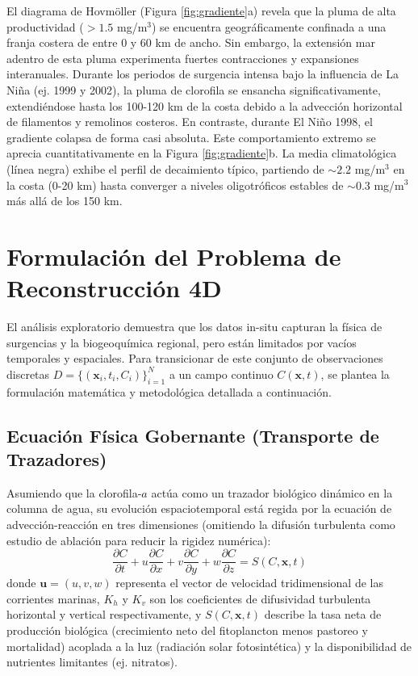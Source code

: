 \documentclass[11pt,a4paper]{article}
\begin{document}
El diagrama de Hovmöller (Figura \ref{fig:gradiente}a) revela que la pluma de alta productividad ($> 1.5$ mg/m$^3$) se encuentra geográficamente confinada a una franja costera de entre 0 y 60 km de ancho. Sin embargo, la extensión mar adentro de esta pluma experimenta fuertes contracciones y expansiones interanuales. Durante los periodos de surgencia intensa bajo la influencia de La Niña (ej. 1999 y 2002), la pluma de clorofila se ensancha significativamente, extendiéndose hasta los 100-120 km de la costa debido a la advección horizontal de filamentos y remolinos costeros. En contraste, durante El Niño 1998, el gradiente colapsa de forma casi absoluta. Este comportamiento extremo se aprecia cuantitativamente en la Figura \ref{fig:gradiente}b. La media climatológica (línea negra) exhibe el perfil de decaimiento típico, partiendo de $\sim 2.2$ mg/m$^3$ en la costa (0-20 km) hasta converger a niveles oligotróficos estables de $\sim 0.3$ mg/m$^3$ más allá de los 150 km. 

\section{Formulación del Problema de Reconstrucción 4D}
El análisis exploratorio demuestra que los datos in-situ capturan la física de surgencias y la biogeoquímica regional, pero están limitados por vacíos temporales y espaciales. Para transicionar de este conjunto de observaciones discretas $D = \{ (\mathbf{x}_i, t_i, C_i) \}_{i=1}^N$ a un campo continuo $C(\mathbf{x}, t)$, se plantea la formulación matemática y metodológica detallada a continuación.

\subsection{Ecuación Física Gobernante (Transporte de Trazadores)}
Asumiendo que la clorofila-$a$ actúa como un trazador biológico dinámico en la columna de agua, su evolución espaciotemporal está regida por la ecuación de advección-reacción en tres dimensiones (omitiendo la difusión turbulenta como estudio de ablación para reducir la rigidez numérica):
\begin{equation}
\frac{\partial C}{\partial t} + u\frac{\partial C}{\partial x} + v\frac{\partial C}{\partial y} + w\frac{\partial C}{\partial z} = S(C, \mathbf{x}, t)
\end{equation}
donde $\mathbf{u} = (u, v, w)$ representa el vector de velocidad tridimensional de las corrientes marinas, $K_h$ y $K_v$ son los coeficientes de difusividad turbulenta horizontal y vertical respectivamente, y $S(C, \mathbf{x}, t)$ describe la tasa neta de producción biológica (crecimiento neto del fitoplancton menos pastoreo y mortalidad) acoplada a la luz (radiación solar fotosintética) y la disponibilidad de nutrientes limitantes (ej. nitratos).
\end{document}
